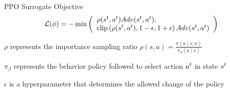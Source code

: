 \begin{frame}[t]{PPO Surrogate Objective}
\begin{equation*}
    \mathcal{L}(\phi) = - \min\left(
        \begin{array}{ll}
            \rho(s^t, a^t) Adv(s^t, a^t),\\
            \text{clip}\left(\rho(s^t, a^t),1 - \epsilon, 1 + \epsilon\right) Adv(s^t, a^t)
        \end{array}
    \right)
\end{equation*}

\blist
    \item $\rho$ represents the importance sampling ratio $\rho(s, a) = \frac{\pi(a \mid s; \phi)}{\pi_\beta(a \mid s)}$
    \item $\pi_\beta$ represents the behavior policy followed to select action $a^t$ in state $s^t$
    \item $\epsilon$ is a hyperparameter that determines the allowed change of the policy
\elist


    
\end{frame}


